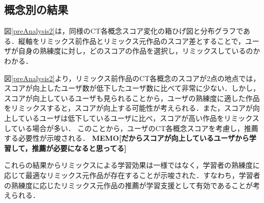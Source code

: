 \documentclass[submit,techrep,noauthor]{ipsj}
\newcommand{\memo}[1]{\colorbox{magenta!30}{\textbf{MEMO}}{\color{red!50}\textbf{[#1]}}}
\begin{document}

\subsection{概念別の結果}

図\ref{preAnalysis2}は，同様のCT各概念スコア変化の箱ひげ図と分布グラフである．縦軸をリミックス前作品とリミックス元作品のスコア差とすることで，ユーザが自身の熟練度に対し，どのスコアの作品を選択し，リミックスしているのかわかる．

図\ref{preAnalysis2}より，リミックス前作品のCT各概念のスコアが2点の地点では，スコアが向上したユーザ数が低下したユーザ数に比べて非常に少ない．しかし，スコアが向上しているユーザも見られることから，ユーザの熟練度に適した作品をリミックスすると，スコアが向上する可能性が考えられる．また，スコアが向上しているユーザは低下しているユーザに比べ，スコアが高い作品をリミックスしている場合が多い．
このことから，ユーザのCT各概念スコアを考慮し，推薦する必要性が示唆される．
\memo{だからスコアが向上しているユーザから学習して，推薦が必要になると思ってる}

これらの結果からリミックスによる学習効果は一様ではなく，学習者の熟練度に応じて最適なリミックス元作品が存在することが示唆された．すなわち，学習者の熟練度に応じたリミックス元作品の推薦が学習支援として有効であることが考えられる．
\end{document}
